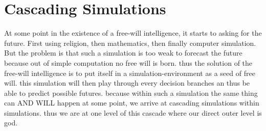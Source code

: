 \documentclass{article}
\begin{document}
\section{Cascading Simulations}
At some point in the existence of a free-will intelligence, it starts to asking for the future. First using religion, then mathematics, then finally computer simulation. But the problem is that such a simulation is too weak to forecast the future because out of simple computation no free will is born. thus the solution of the free-will intelligence is to put itself in a simulation-environment as a seed of free will. this simulation will then play through every decision branches an thus be able to predict possible futures. because within such a simulation the same thing can AND WILL happen at some point, we arrive at cascading simulations within simulations. thus we are at one level of this cascade where our direct outer level is god.
\end{document}
